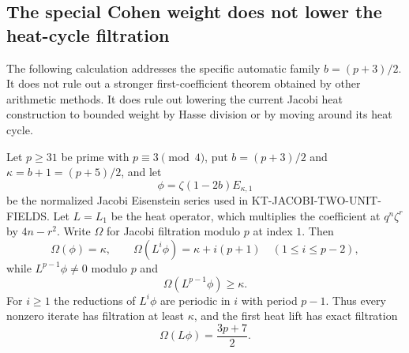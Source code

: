 \subsection{The special Cohen weight does not lower the heat-cycle filtration}

The following calculation addresses the specific automatic family
$b=(p+3)/2$.  It does not rule out a stronger first-coefficient
theorem obtained by other arithmetic methods.  It does rule out
lowering the current Jacobi heat construction to bounded weight
by Hasse division or by moving around its heat cycle.

\begin{proposition}
Let $p\geq31$ be prime with $p\equiv3\pmod4$, put
$b=(p+3)/2$ and $\kappa=b+1=(p+5)/2$, and let
\[
 \phi=\zeta(1-2b)E_{\kappa,1}
\]
be the normalized Jacobi Eisenstein series used in
KT-JACOBI-TWO-UNIT-FIELDS.  Let $L=L_1$ be the heat operator,
which multiplies the coefficient at $q^n\zeta^r$ by $4n-r^2$.
Write $\Omega$ for Jacobi filtration modulo $p$ at index $1$.
Then
\[
 \Omega(\phi)=\kappa,\qquad
 \Omega(L^i\phi)=\kappa+i(p+1)\quad(1\leq i\leq p-2),
 \tag{HC.1}
\]
while $L^{p-1}\phi\ne0$ modulo $p$ and
\[
 \Omega(L^{p-1}\phi)\geq\kappa.
 \tag{HC.2}
\]
For $i\geq1$ the reductions of $L^i\phi$ are periodic in $i$
with period $p-1$.  Thus every nonzero iterate has filtration
at least $\kappa$, and the first heat lift has exact filtration
\[
 \Omega(L\phi)=\frac{3p+7}{2}.
 \tag{HC.3}
\]
\end{proposition}

